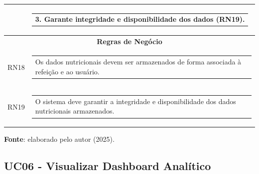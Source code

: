 \begin{longtable}[c]{|p{}|p{}|}
\multicolumn{1}{|p{0.48\textwidth}|}{} &
  \begin{tabular}[c]{@{}p{}@{}}3. Garante integridade e disponibilidade dos dados (RN19).\end{tabular} \\ \hline
\multicolumn{2}{|c|}{\textbf{Regras de Negócio}} \\ \hline
\multicolumn{1}{|p{0.48\textwidth}|}{RN18} &
  \begin{tabular}[c]{@{}p{}@{}}Os dados nutricionais devem ser armazenados de forma associada à refeição e ao usuário.\end{tabular} \\ \hline
\multicolumn{1}{|p{0.48\textwidth}|}{RN19} &
  \begin{tabular}[c]{@{}p{}@{}}O sistema deve garantir a integridade e disponibilidade dos dados nutricionais armazenados.\end{tabular} \\ \hline
\end{longtable}
\begin{center}
    \small{\textbf{Fonte}: elaborado pelo autor (2025).}
\end{center}


\subsection{UC06 - Visualizar Dashboard Analítico}

